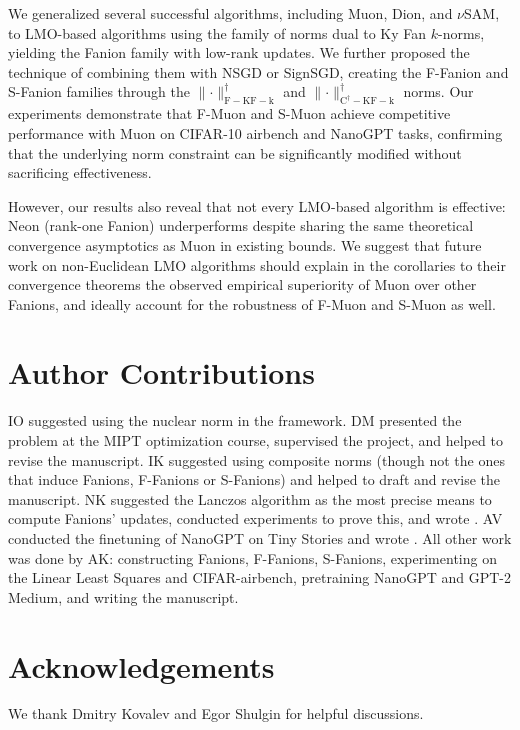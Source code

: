 \documentclass[pmlr]{jmlr}%
\newcommand{\norm}[1]{\lVert #1\rVert}
\begin{document}
 We generalized several successful algorithms, including Muon, Dion, and $\nu$SAM, to LMO-based algorithms using the family of norms dual to Ky Fan $k$-norms, yielding the Fanion family with low-rank updates. We further proposed the technique of combining them with NSGD or SignSGD, creating the F-Fanion and S-Fanion families through the $\norm{\cdot}_{\mathrm{F-KF-k}}^\dagger$ and $\norm{\cdot}_{\mathrm{C^\dagger-KF-k}}^\dagger$ norms. Our experiments demonstrate that F-Muon and S-Muon achieve competitive performance with Muon on CIFAR-10 airbench and NanoGPT tasks, confirming that the underlying norm constraint can be significantly modified without sacrificing effectiveness.
 
 However, our results also reveal that not every LMO-based algorithm is effective: Neon (rank-one Fanion) underperforms despite sharing the same theoretical convergence asymptotics as Muon in existing bounds. We suggest that future work on non-Euclidean LMO algorithms should explain in the corollaries to their convergence theorems the observed empirical superiority of Muon over other Fanions, and ideally account for the robustness of F-Muon and S-Muon as well.
 
 \section*{Author Contributions}
 
 IO suggested using the nuclear norm in the \citep{bernstein2024oldoptimizernewnorm} framework. DM presented the problem at the MIPT optimization course, supervised the project, and helped to revise the manuscript. IK suggested using composite norms (though not the ones that induce Fanions, F-Fanions or S-Fanions) and helped to draft and revise the manuscript. NK suggested the Lanczos algorithm as the most precise means to compute Fanions' updates, conducted experiments to prove this, and wrote . AV conducted the finetuning of NanoGPT on Tiny Stories and wrote . All other work was done by AK: constructing Fanions, F-Fanions, S-Fanions, experimenting on the Linear Least Squares and CIFAR-airbench, pretraining NanoGPT and GPT-2 Medium, and writing the manuscript.
 
 \section*{Acknowledgements}
 We thank Dmitry Kovalev and Egor Shulgin for helpful discussions.
 
\end{document}
